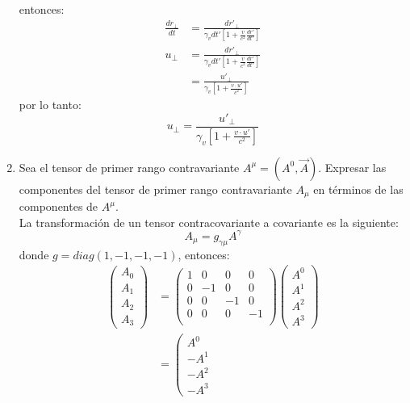 \documentclass[12pt,letterpaper]{report}
\begin{document}
\begin{enumerate}
\begin{align*}
    \end{align*}
    entonces:
    \begin{align*}
        \frac{dr_\perp}{dt}&= \frac{{dr}'_\perp}{\gamma_v {dt}'\left[1+\frac{v}{c^2} \frac{{dr}'}{{dt}'} \right]}\\
        u_\perp&= \frac{{dr}'_\perp}{\gamma_v {dt}' \left[1+\frac{v}{c^2}\frac{{dr}'}{{dt}'} \right]}\\
        & = \frac{{u}'_\perp}{\gamma_v \left[1+\frac{v\cdot {u}'}{c^2} \right]}
    \end{align*}
    por lo tanto:
    \begin{equation*}
        u_\perp = \frac{{u}'_\perp}{\gamma_v \left[1+\frac{v\cdot {u}'}{c^2} \right]}
    \end{equation*}
    \item Sea el tensor de primer rango contravariante $A^\mu=(A^0,\vec{A})$. Expresar las componentes del tensor de primer rango contravariante
    $A_\mu$ en términos de las componentes de $A^\mu$.\\
    La transformación de un tensor contracovariante a covariante es la siguiente:
    \begin{equation*}
        A_\mu = g_{\gamma \mu} A^\gamma 
    \end{equation*}
    donde $g=diag(1,-1,-1,-1)$, entonces:
    \begin{align*}
        \left(\begin{matrix}
            A_0 \\ A_1 \\ A_2 \\ A_3 
        \end{matrix}\right)&= 
        \left(\begin{matrix}
        1 & 0 & 0 & 0 \\
        0 & -1 & 0 & 0 \\
        0 & 0 & -1 & 0 \\
        0 & 0 & 0 & -1 \\
        \end{matrix}\right)\left(
           \begin{matrix}          
        A^0 \\ A^1 \\ A^2 \\ A^3 \end{matrix}
        \right)\\
        & =\left( \begin{matrix}
            A^0 \\ -A^1 \\ -A^2 \\ -A^3

\end{matrix}
\end{align*}
\end{enumerate}
\end{document}
